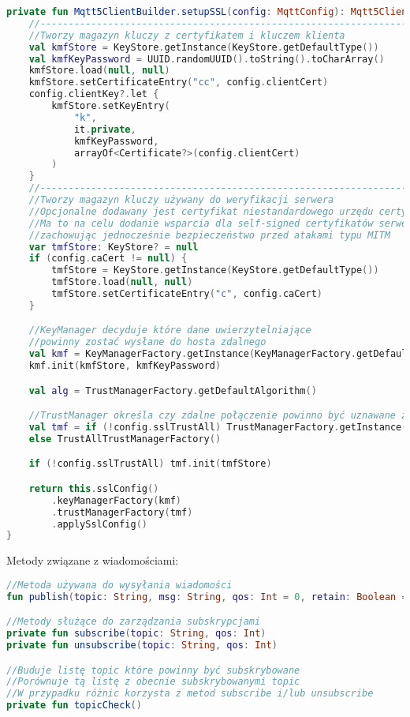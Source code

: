 \begin{lstlisting}[language=Kotlin]
private fun Mqtt5ClientBuilder.setupSSL(config: MqttConfig): Mqtt5ClientBuilder {
    //---------------------------------------------------------------------------
    //Tworzy magazyn kluczy z certyfikatem i kluczem klienta
    val kmfStore = KeyStore.getInstance(KeyStore.getDefaultType())
    val kmfKeyPassword = UUID.randomUUID().toString().toCharArray()
    kmfStore.load(null, null)
    kmfStore.setCertificateEntry("cc", config.clientCert)
    config.clientKey?.let {
        kmfStore.setKeyEntry(
            "k",
            it.private,
            kmfKeyPassword,
            arrayOf<Certificate?>(config.clientCert)
        )
    }
    //---------------------------------------------------------------------------
    //Tworzy magazyn kluczy używany do weryfikacji serwera
    //Opcjonalne dodawany jest certyfikat niestandardowego urzędu certyfikacji
    //Ma to na celu dodanie wsparcia dla self-signed certyfikatów serwera
    //zachowując jednocześnie bezpieczeństwo przed atakami typu MITM
    var tmfStore: KeyStore? = null
    if (config.caCert != null) {
        tmfStore = KeyStore.getInstance(KeyStore.getDefaultType())
        tmfStore.load(null, null)
        tmfStore.setCertificateEntry("c", config.caCert)
    }

    //KeyManager decyduje które dane uwierzytelniające
    //powinny zostać wysłane do hosta zdalnego
    val kmf = KeyManagerFactory.getInstance(KeyManagerFactory.getDefaultAlgorithm())
    kmf.init(kmfStore, kmfKeyPassword)

    val alg = TrustManagerFactory.getDefaultAlgorithm()

    //TrustManager określa czy zdalne połączenie powinno być uznawane za zaufane
    val tmf = if (!config.sslTrustAll) TrustManagerFactory.getInstance(alg)
    else TrustAllTrustManagerFactory()

    if (!config.sslTrustAll) tmf.init(tmfStore)

    return this.sslConfig()
        .keyManagerFactory(kmf)
        .trustManagerFactory(tmf)
        .applySslConfig()
}
\end{lstlisting}

\newpage

Metody związane z wiadomościami:

\begin{lstlisting}[language=Kotlin]
//Metoda używana do wysyłania wiadomości
fun publish(topic: String, msg: String, qos: Int = 0, retain: Boolean = false)

//Metody służące do zarządzania subskrypcjami
private fun subscribe(topic: String, qos: Int)
private fun unsubscribe(topic: String, qos: Int)

//Buduje listę topic które powinny być subskrybowane
//Porównuje tą listę z obecnie subskrybowanymi topic
//W przypadku różnic korzysta z metod subscribe i/lub unsubscribe
private fun topicCheck()
\end{lstlisting}


